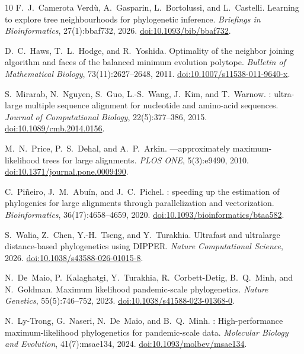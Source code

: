 \begin{thebibliography}{10}
F.~J.~Camerota Verd\`u, A.~Gasparin, L.~Bortolussi, and L.~Castelli.
\newblock Learning to explore tree neighbourhoods for phylogenetic inference.
\newblock \emph{Briefings in Bioinformatics}, 27(1):bbaf732, 2026.
\newblock \href{https://doi.org/10.1093/bib/bbaf732}{doi:10.1093/bib/bbaf732}.

D.~C.~Haws, T.~L.~Hodge, and R.~Yoshida.
\newblock Optimality of the neighbor joining algorithm and faces of the balanced minimum evolution polytope.
\newblock \emph{Bulletin of Mathematical Biology}, 73(11):2627--2648, 2011.
\newblock \href{https://doi.org/10.1007/s11538-011-9640-x}{doi:10.1007/s11538-011-9640-x}.

S.~Mirarab, N.~Nguyen, S.~Guo, L.-S.~Wang, J.~Kim, and T.~Warnow.
: ultra-large multiple sequence alignment for nucleotide and amino-acid sequences.
\newblock \emph{Journal of Computational Biology}, 22(5):377--386, 2015.
\newblock \href{https://doi.org/10.1089/cmb.2014.0156}{doi:10.1089/cmb.2014.0156}.

M.~N.~Price, P.~S.~Dehal, and A.~P.~Arkin.
---approximately maximum-likelihood trees for large alignments.
\newblock \emph{PLOS ONE}, 5(3):e9490, 2010.
\newblock \href{https://doi.org/10.1371/journal.pone.0009490}{doi:10.1371/journal.pone.0009490}.

C.~Pi\~neiro, J.~M.~Abu\'in, and J.~C.~Pichel.
: speeding up the estimation of phylogenies for large alignments through parallelization and vectorization.
\newblock \emph{Bioinformatics}, 36(17):4658--4659, 2020.
\newblock \href{https://doi.org/10.1093/bioinformatics/btaa582}{doi:10.1093/bioinformatics/btaa582}.

S.~Walia, Z.~Chen, Y.-H.~Tseng, and Y.~Turakhia.
\newblock Ultrafast and ultralarge distance-based phylogenetics using {DIPPER}.
\newblock \emph{Nature Computational Science}, 2026.
\newblock \href{https://doi.org/10.1038/s43588-026-01015-8}{doi:10.1038/s43588-026-01015-8}.

N.~De~Maio, P.~Kalaghatgi, Y.~Turakhia, R.~Corbett-Detig, B.~Q.~Minh, and N.~Goldman.
\newblock Maximum likelihood pandemic-scale phylogenetics.
\newblock \emph{Nature Genetics}, 55(5):746--752, 2023.
\newblock \href{https://doi.org/10.1038/s41588-023-01368-0}{doi:10.1038/s41588-023-01368-0}.

N.~Ly-Trong, G.~Naseri, N.~De~Maio, and B.~Q.~Minh.
: High-performance maximum-likelihood phylogenetics for pandemic-scale data.
\newblock \emph{Molecular Biology and Evolution}, 41(7):msae134, 2024.
\newblock \href{https://doi.org/10.1093/molbev/msae134}{doi:10.1093/molbev/msae134}.


\end{thebibliography}
